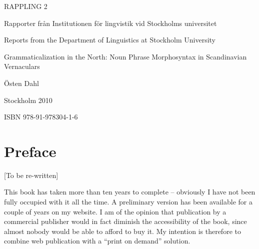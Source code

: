 \clearpage\clearpage%
RAPPLING 2


Rapporter från Institutionen för lingvistik vid Stockholms universitet


Reports from the Department of Linguistics at Stockholm University

Grammaticalization in the North:\newline
Noun Phrase Morphosyntax\newline
in Scandinavian Vernaculars


Östen Dahl


Stockholm 2010


ISBN 978-91-978304-1-6


\clearpage\section[Preface]{\rmfamily Preface}
[To be re-written]

This book has taken more than ten years to complete – obviously I have not been fully occupied with it all the time. A preliminary version has been available for a couple of years on my website. I am of the opinion that publication by a commercial publisher would in fact diminish the accessibility of the book, since almost nobody would be able to afford to buy it. My intention is therefore to combine web publication with a “print on demand” solution. 

